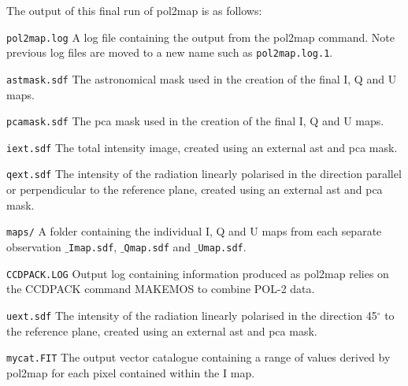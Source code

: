 The output of this final run of pol2map is as follows:

\begin{aligndesc}
\item[\texttt{pol2map.log}] A log file containing the output from the
  pol2map command. Note previous log files are moved to a new name
  such as \texttt{pol2map.log.1}.

\item[\texttt{astmask.sdf}] The astronomical mask used in the creation
  of the final I, Q and U maps.

\item[\texttt{pcamask.sdf}] The pca mask used in the creation of the
  final I, Q and U maps.

\item[\texttt{iext.sdf}] The total intensity image, created using an
  external ast and pca mask.

\item[\texttt{qext.sdf}] The intensity of the radiation linearly
  polarised in the direction parallel or perpendicular to the
  reference plane, created using an external ast and pca mask.

\item[\texttt{maps/}] A folder containing the individual I, Q and U
  maps from each separate observation \texttt{$\_$Imap.sdf},
  \texttt{$\_$Qmap.sdf} and \texttt{$\_$Umap.sdf}.

\item[\texttt{CCDPACK.LOG}] Output log containing information produced
  as pol2map relies on the CCDPACK command MAKEMOS to combine POL-2
  data.

\item[\texttt{uext.sdf}] The intensity of the radiation linearly
  polarised in the direction 45$^{\circ }$ to the reference plane,
  created using an external ast and pca mask.

\item[\texttt{mycat.FIT}] The output vector catalogue containing a
  range of values derived by pol2map for each pixel contained within
  the I map.

\end{aligndesc}







